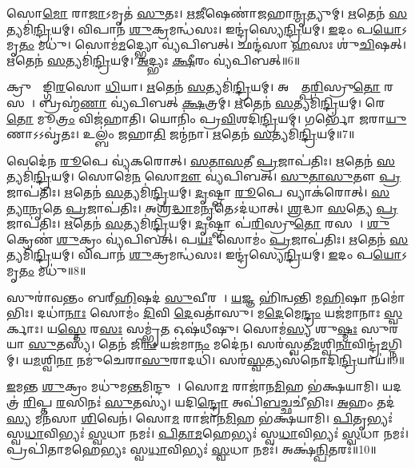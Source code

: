 𑌸𑍋\ul{𑌮𑍋} 𑌰𑌾\ul{𑌜𑌾}\-𑌽𑌮𑍃𑌤॑ \ul{𑌸𑍁}𑌤𑌃।
\ul{𑌋}\ul{𑌜𑍀}𑌷𑍇𑌣𑌾॑𑌜𑌹𑌾\ul{𑌨𑍍𑌮𑍃}𑌤𑍍𑌯𑍁𑌮𑍍।
\ul{𑌋}𑌤𑍇𑌨॑ \ul{𑌸}𑌤𑍍𑌯𑌮𑌿॑\ul{𑌨𑍍𑌦𑍍𑌰𑌿}𑌯𑌮𑍍।
𑌵𑌿𑌪𑌾𑌨॑ \ul{𑌶𑍁}𑌕𑍍𑌰𑌮𑌨𑍍𑌧॑𑌸𑌃।
𑌇𑌨𑍍𑌦𑍍𑌰॑𑌸𑍍𑌯𑍇\ul{𑌨𑍍𑌦𑍍𑌰𑌿}𑌯𑌮𑍍।
\ul{𑌇}𑌦𑌂 𑌪\ul{𑌯𑍋}\-𑌽𑌮𑍃\ul{𑌤𑌂} 𑌮𑌧𑍁॑।
𑌸𑍋𑌮॑\ul{𑌮}𑌦𑍍𑌭𑍍𑌯𑍋 𑌵𑍍𑌯॑𑌪𑌿𑌬𑌤𑍍।
𑌛𑌨𑍍𑌦॑𑌸𑌾 \ul{𑌹}\ul{}𑌸𑌃 𑌶𑍁॑\ul{𑌚𑌿}𑌷𑌤𑍍।
\ul{𑌋}𑌤𑍇𑌨॑ \ul{𑌸}𑌤𑍍𑌯𑌮𑌿॑\ul{𑌨𑍍𑌦𑍍𑌰𑌿}𑌯𑌮𑍍।
\ul{𑌅}𑌦𑍍𑌭𑍍𑌯𑌃 \ul{𑌕𑍍𑌷𑍀}𑌰𑌂 𑌵𑍍𑌯॑𑌪𑌿𑌬𑌤𑍍॥6॥

𑌕𑍍𑌰𑍁𑌙𑍍𑌙𑌾᳚𑌙𑍍𑌗𑌿\ul{𑌰}𑌸𑍋 \ul{𑌧𑌿}𑌯𑌾।
\ul{𑌋}𑌤𑍇𑌨॑ \ul{𑌸}𑌤𑍍𑌯𑌮𑌿॑\ul{𑌨𑍍𑌦𑍍𑌰𑌿}𑌯𑌮𑍍।
𑌅𑌨𑍍𑌨𑌾᳚𑌤𑍍𑌪\ul{𑌰𑌿}𑌸𑍍𑌰𑍁\ul{𑌤𑍋} 𑌰𑌸𑌮𑍍᳚।
𑌬𑍍𑌰𑌹𑍍𑌮॑\ul{𑌣𑌾} 𑌵𑍍𑌯॑𑌪𑌿𑌬𑌤𑍍 \ul{𑌕𑍍𑌷}𑌤𑍍𑌰𑌮𑍍।
\ul{𑌋}𑌤𑍇𑌨॑ \ul{𑌸}𑌤𑍍𑌯𑌮𑌿॑\ul{𑌨𑍍𑌦𑍍𑌰𑌿}𑌯𑌮𑍍।
𑌰𑍇\ul{𑌤𑍋} 𑌮𑍂\ul{𑌤𑍍𑌰𑌂} 𑌵𑌿𑌜॑𑌹𑌾𑌤𑌿।
𑌯𑍋𑌨𑌿𑌂॑ 𑌪𑍍𑌰\ul{𑌵𑌿}𑌶𑌦𑌿॑\ul{𑌨𑍍𑌦𑍍𑌰𑌿}𑌯𑌮𑍍।
𑌗𑌰𑍍𑌭𑍋॑ \ul{𑌜}𑌰𑌾\ul{𑌯𑍁}𑌣𑌾\-𑌽𑌽𑌵𑍃॑𑌤𑌃।
𑌉𑌲𑍍𑌬𑌂॑ 𑌜𑌹𑌾\ul{𑌤𑌿} 𑌜𑌨𑍍𑌮॑𑌨𑌾।
\ul{𑌋}𑌤𑍇𑌨॑ \ul{𑌸}𑌤𑍍𑌯𑌮𑌿॑\ul{𑌨𑍍𑌦𑍍𑌰𑌿}𑌯𑌮𑍍॥7॥

𑌵𑍇𑌦𑍇॑𑌨 \ul{𑌰𑍂}𑌪𑍇 𑌵𑍍𑌯॑𑌕𑌰𑍋𑌤𑍍।
\ul{𑌸}\ul{𑌤𑌾}\ul{𑌸}𑌤𑍀 \ul{𑌪𑍍𑌰}𑌜𑌾𑌪॑𑌤𑌿𑌃।
\ul{𑌋}𑌤𑍇𑌨॑ \ul{𑌸}𑌤𑍍𑌯𑌮𑌿॑\ul{𑌨𑍍𑌦𑍍𑌰𑌿}𑌯𑌮𑍍।
𑌸𑍋𑌮𑍇॑\ul{𑌨} 𑌸𑍋\ul{𑌮𑍗} 𑌵𑍍𑌯॑𑌪𑌿𑌬𑌤𑍍।
\ul{𑌸𑍁}\ul{𑌤𑌾}\ul{𑌸𑍁}𑌤𑍗 \ul{𑌪𑍍𑌰}𑌜𑌾𑌪॑𑌤𑌿𑌃।
\ul{𑌋}𑌤𑍇𑌨॑ \ul{𑌸}𑌤𑍍𑌯𑌮𑌿॑\ul{𑌨𑍍𑌦𑍍𑌰𑌿}𑌯𑌮𑍍।
\ul{𑌦𑍃}𑌷𑍍𑌟𑍍𑌵𑌾 \ul{𑌰𑍂}𑌪𑍇 𑌵𑍍𑌯𑌾𑌕॑𑌰𑍋𑌤𑍍।
\ul{𑌸}\ul{𑌤𑍍𑌯𑌾}\ul{𑌨𑍃}𑌤𑍇 \ul{𑌪𑍍𑌰}𑌜𑌾𑌪॑𑌤𑌿𑌃।
𑌅𑌶𑍍𑌰॑\ul{𑌦𑍍𑌧𑌾}𑌮\ul{𑌨𑍃}𑌤𑍇\-𑌽𑌦॑𑌧𑌾𑌤𑍍।
\ul{𑌶𑍍𑌰}𑌦𑍍𑌧𑌾 \ul{𑌸}𑌤𑍍𑌯𑍇 \ul{𑌪𑍍𑌰}𑌜𑌾𑌪॑𑌤𑌿𑌃।
\ul{𑌋}𑌤𑍇𑌨॑ \ul{𑌸}𑌤𑍍𑌯𑌮𑌿॑\ul{𑌨𑍍𑌦𑍍𑌰𑌿}𑌯𑌮𑍍।
\ul{𑌦𑍃}𑌷𑍍𑌟𑍍𑌵𑌾 𑌪॑\ul{𑌰𑌿}𑌸𑍍𑌰𑍁\ul{𑌤𑍋} 𑌰𑌸𑌮𑍍᳚।
\ul{𑌶𑍁}𑌕𑍍𑌰𑍇𑌣॑ \ul{𑌶𑍁}𑌕𑍍𑌰𑌂 𑌵𑍍𑌯॑𑌪𑌿𑌬𑌤𑍍।
𑌪\ul{𑌯𑌃} 𑌸𑍋𑌮𑌂॑ \ul{𑌪𑍍𑌰}𑌜𑌾𑌪॑𑌤𑌿𑌃।
\ul{𑌋}𑌤𑍇𑌨॑ \ul{𑌸}𑌤𑍍𑌯𑌮𑌿॑\ul{𑌨𑍍𑌦𑍍𑌰𑌿}𑌯𑌮𑍍।
𑌵𑌿𑌪𑌾𑌨॑ \ul{𑌶𑍁}𑌕𑍍𑌰𑌮𑌨𑍍𑌧॑𑌸𑌃।
𑌇𑌨𑍍𑌦𑍍𑌰॑𑌸𑍍𑌯𑍇\ul{𑌨𑍍𑌦𑍍𑌰𑌿}𑌯𑌮𑍍।
\ul{𑌇}𑌦𑌂 𑌪\ul{𑌯𑍋}\-𑌽𑌮𑍃\ul{𑌤𑌂} 𑌮𑌧𑍁॑॥8॥

𑌸𑍁𑌰𑌾॑𑌵𑌨𑍍𑌤𑌂 𑌬𑌰𑍍‌\mbox{}\ul{𑌹𑌿}𑌷𑌦॑ \ul{𑌸𑍁}𑌵𑍀𑌰𑌮𑍍᳚।
\ul{𑌯}𑌜𑍍𑌞 𑌹𑌿॑𑌨𑍍𑌵𑌨𑍍𑌤𑌿 𑌮\ul{𑌹𑌿}𑌷𑌾 𑌨𑌮𑍋॑𑌭𑌿𑌃।
𑌦𑌧𑌾॑\ul{𑌨𑌾𑌃} 𑌸𑍋𑌮𑌂॑ \ul{𑌦𑌿}𑌵𑌿 \ul{𑌦𑍇}𑌵𑌤𑌾॑𑌸𑍁।
𑌮\ul{𑌦𑍇}𑌮𑍇\ul{𑌨𑍍𑌦𑍍𑌰𑌂} 𑌯𑌜॑𑌮𑌾𑌨𑌾𑌃 \ul{𑌸𑍍𑌵}𑌰𑍍𑌕𑌾𑌃।
𑌯\ul{𑌸𑍍𑌤𑍇} 𑌰\ul{𑌸𑌃} 𑌸𑌮𑍍𑌭𑍃॑\ul{𑌤} 𑌓𑌷॑𑌧𑍀𑌷𑍁।
𑌸𑍋𑌮॑\ul{𑌸𑍍𑌯} 𑌶𑍁\ul{𑌷𑍍𑌮𑌃} 𑌸𑍁𑌰॑𑌯𑌾 \ul{𑌸𑍁}𑌤𑌸𑍍𑌯॑।
𑌤𑍇𑌨॑ 𑌜𑌿\ul{𑌨𑍍𑌵} 𑌯𑌜॑𑌮𑌾\ul{𑌨𑌂} 𑌮𑌦𑍇॑𑌨।
𑌸𑌰॑𑌸𑍍𑌵𑌤𑍀\ul{𑌮}𑌶𑍍𑌵𑌿\ul{𑌨𑌾}𑌵𑌿𑌨𑍍𑌦𑍍𑌰॑\ul{𑌮}𑌗𑍍𑌨𑌿𑌮𑍍।
𑌯\ul{𑌮}𑌶𑍍𑌵𑌿\ul{𑌨𑌾} 𑌨𑌮𑍁॑𑌚𑍇𑌰𑌾\ul{𑌸𑍁}𑌰𑌾𑌦𑌧𑌿॑।
𑌸𑌰॑\ul{𑌸𑍍𑌵}𑌤𑍍𑌯𑌸॑𑌨𑍋𑌦𑌿\ul{𑌨𑍍𑌦𑍍𑌰𑌿}𑌯𑌾𑌯॑॥9॥

\ul{𑌇}𑌮𑌨𑍍𑌤 \ul{𑌶𑍁}𑌕𑍍𑌰𑌂 𑌮𑌧𑍁॑𑌮\ul{𑌨𑍍𑌤}𑌮𑌿𑌨𑍍𑌦𑍁𑌮𑍍᳚।
𑌸𑍋\ul{𑌮}\ul{} 𑌰𑌾𑌜𑌾॑𑌨\ul{𑌮𑌿}𑌹 𑌭॑𑌕𑍍𑌷𑌯𑌾𑌮𑌿।
𑌯𑌦𑌤𑍍𑌰॑ \ul{𑌰𑌿}𑌪𑍍𑌤 \ul{𑌰}𑌸𑌿𑌨𑌃॑ \ul{𑌸𑍁}𑌤𑌸𑍍𑌯॑।
𑌯𑌦𑌿\ul{𑌨𑍍𑌦𑍍𑌰𑍋} 𑌅𑌪𑌿॑\ul{𑌬}𑌚𑍍𑌛𑌚𑍀॑𑌭𑌿𑌃।
\ul{𑌅}𑌹𑌂 𑌤𑌦॑\ul{𑌸𑍍𑌯} 𑌮𑌨॑𑌸𑌾 \ul{𑌶𑌿}𑌵𑍇𑌨॑।
𑌸𑍋\ul{𑌮}\ul{} 𑌰𑌾𑌜𑌾॑𑌨\ul{𑌮𑌿}𑌹 𑌭॑𑌕𑍍𑌷𑌯𑌾𑌮𑌿।
\ul{𑌪𑌿}𑌤𑍃𑌭𑍍𑌯𑌃॑ 𑌸𑍍𑌵\ul{𑌧𑌾}𑌵𑌿𑌭𑍍𑌯𑌃॑ \ul{𑌸𑍍𑌵}𑌧𑌾 𑌨𑌮𑌃॑।
\ul{𑌪𑌿}\ul{𑌤𑌾}\ul{𑌮}𑌹𑍇𑌭𑍍𑌯𑌃॑ 𑌸𑍍𑌵\ul{𑌧𑌾}𑌵𑌿𑌭𑍍𑌯𑌃॑ \ul{𑌸𑍍𑌵}𑌧𑌾 𑌨𑌮𑌃॑।
𑌪𑍍𑌰𑌪𑌿॑𑌤𑌾𑌮𑌹𑍇𑌭𑍍𑌯𑌃 𑌸𑍍𑌵\ul{𑌧𑌾}𑌵𑌿𑌭𑍍𑌯𑌃॑ \ul{𑌸𑍍𑌵}𑌧𑌾 𑌨𑌮𑌃॑।
𑌅𑌕𑍍𑌷॑\ul{𑌨𑍍𑌪𑌿}𑌤𑌰𑌃॑॥10॥

